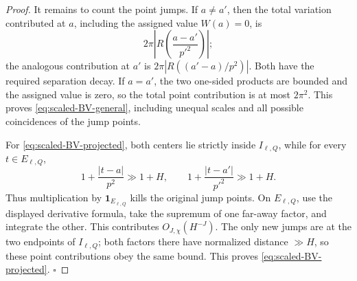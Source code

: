 \documentclass[11pt]{article}
\numberwithin{equation}{section}
\theoremstyle{definition}
\newcommand{\1}{\mathbf 1}
\begin{document}
\begin{proof}
It remains to count the point jumps.  If \(a\ne a'\), then the total
variation contributed at \(a\), including the assigned value
\(W(a)=0\), is
\[
 2\pi\left|R\left(\frac{a-a'}{p'^2}\right)\right|;
\]
the analogous contribution at \(a'\) is
\(2\pi|R((a'-a)/p^2)|\).  Both have the required separation decay.
If \(a=a'\), the two one-sided products are bounded and the assigned
value is zero, so the total point contribution is at most \(2\pi^2\).
This proves \eqref{eq:scaled-BV-general}, including unequal scales and
all possible coincidences of the jump points.

For \eqref{eq:scaled-BV-projected}, both centers lie strictly inside
\(I_{\ell,Q}\), while for every \(t\in E_{\ell,Q}\),
\[
 1+\frac{|t-a|}{p^2}\gg1+H,
 \qquad
 1+\frac{|t-a'|}{p'^2}\gg1+H.
\]
Thus multiplication by \(\1_{E_{\ell,Q}}\) kills the original jump
points.  On \(E_{\ell,Q}\), use the displayed derivative formula,
take the supremum of one far-away factor, and integrate the other.
This contributes \(O_{J,\chi}(H^{-J})\).  The only new jumps are at
the two endpoints of \(I_{\ell,Q}\); both factors there have
normalized distance \(\gg H\), so these point contributions obey the
same bound.  This proves \eqref{eq:scaled-BV-projected}.
\hfill\(\square\)\par
\medskip


\end{proof}
\end{document}
